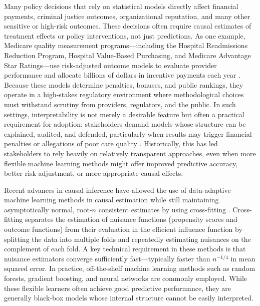 \documentclass[12pt]{article}
\begin{document}
Many policy decisions that rely on statistical models directly affect financial payments, criminal justice outcomes, organizational reputation, and many other sensitive or high-risk outcomes. These decisions often require causal estimates of treatment effects or policy interventions, not just predictions. As one example, Medicare quality measurement programs---including the Hospital Readmissions Reduction Program, Hospital Value-Based Purchasing, and Medicare Advantage Star Ratings---use risk-adjusted outcome models to evaluate provider performance and allocate billions of dollars in incentive payments each year \citep{cms_quality}. Because these models determine penalties, bonuses, and public rankings, they operate in a high-stakes regulatory environment where methodological choices must withstand scrutiny from providers, regulators, and the public. In such settings, interpretability is not merely a desirable feature but often a practical requirement for adoption: stakeholders demand models whose structure can be explained, audited, and defended, particularly when results may trigger financial penalties or allegations of poor care quality \citep{obermeyer2019, rajkomar2019, rudin2019}. Historically, this has led stakeholders to rely heavily on relatively transparent approaches, even when more flexible machine learning methods might offer improved predictive accuracy, better risk adjustment, or more appropriate causal effects.

Recent advances in causal inference have allowed the use of data-adaptive machine learning methods in causal estimation while still maintaining asymptotically normal, root-$n$ consistent estimates by using cross-fitting \citep{chernozhukov2018}. Cross-fitting separates the estimation of nuisance functions (propensity scores and outcome functions) from their evaluation in the efficient influence function by splitting the data into multiple folds and repeatedly estimating nuisances on the complement of each fold. A key technical requirement in these methods is that nuisance estimators converge sufficiently fast---typically faster than $n^{-1/4}$ in mean squared error. In practice, off-the-shelf machine learning methods such as random forests, gradient boosting, and neural networks are commonly employed\citep{bach2021, susmann2025}. While these flexible learners often achieve good predictive performance, they are generally black-box models whose internal structure cannot be easily interpreted. 
\end{document}
